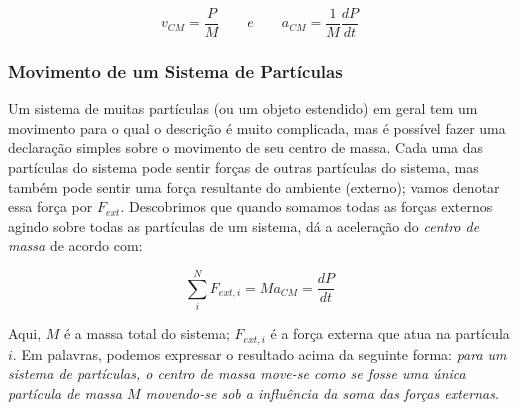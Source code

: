 $$
v_{CM}=\frac{P}{M} \qquad e \qquad a_{CM}=\frac{1}{M}\frac{dP}{dt}
$$

\subsubsection{Movimento de um Sistema de Partículas}
Um sistema de muitas partículas (ou um objeto estendido) em geral tem um movimento para o qual o descrição é muito complicada, mas é possível fazer uma declaração simples sobre o
movimento de seu centro de massa. Cada uma das partículas do sistema pode sentir forças de outras partículas do sistema, mas também pode sentir uma força resultante do ambiente (externo); vamos denotar essa força por $F_{ext}$. Descobrimos que quando somamos todas as forças externos agindo sobre todas as partículas de um sistema, dá a aceleração do \emph{centro de massa} de acordo com:

\begin{equation}
    \sum_{i}^{N}F_{ext, i}=Ma_{CM}=\frac{dP}{dt}
\end{equation}

Aqui, $M$ é a massa total do sistema; $F_{ext, i}$ é a força externa que atua na partícula $i$.
Em palavras, podemos expressar o resultado acima da seguinte forma: \emph{para um sistema de partículas, o centro de massa move-se como se fosse uma única partícula de massa $M$ movendo-se sob a influência da soma das forças externas}.